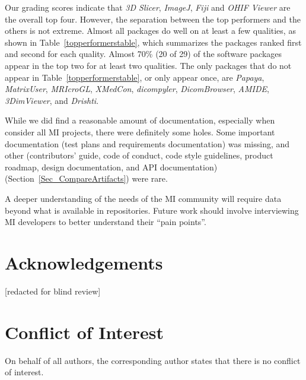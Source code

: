 \documentclass[final, 12pt, 3p, times]{elsarticle}
\begin{document}
Our grading scores indicate that
\textit{3D Slicer}, \textit{ImageJ}, \textit{Fiji}
and \textit{OHIF Viewer} are the overall top four.  However, the
separation between the top performers and the others is not extreme.  Almost
all packages do well on at least a few qualities, as shown in
Table~\ref{topperformerstable}, which summarizes the packages ranked first and
second for each quality. Almost 70\% (20 of 29) of the software packages appear
in the top two for at least two qualities.  The only packages that do not appear
in Table~\ref{topperformerstable}, or only appear once, are \textit{Papaya},
\textit{MatrixUser}, \textit{MRIcroGL}, \textit{XMedCon}, \textit{dicompyler},
\textit{DicomBrowser}, \textit{AMIDE}, \textit{3DimViewer}, and
\textit{Drishti}.

While we did find a reasonable amount of documentation, especially when
consider all MI projects, there were definitely some holes. Some important
documentation (test plans and requirements documentation) was missing,
and other (contributors' guide, code of conduct, code style guidelines, product
roadmap, design documentation, and API documentation)
(Section~\ref{Sec_CompareArtifacts}) were rare.

A deeper understanding of the needs of
the MI community will require data beyond what is available in
repositories.  Future work should involve interviewing MI developers to
better understand their ``pain points''.

\section*{Acknowledgements}

[redacted for blind review]

\section*{Conflict of Interest}

On behalf of all authors, the corresponding author states that there is no
conflict of interest.



\end{document}
